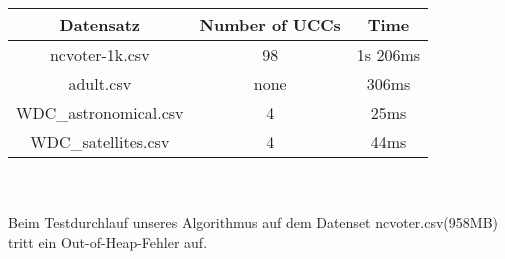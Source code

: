\documentclass{scrartcl}
\begin{document}
\begin{tabular}{c|c|c}
Datensatz & Number of UCCs & Time \\
\hline
ncvoter-1k.csv & 98 & 1s 206ms \\
adult.csv & none & 306ms \\
WDC\_astronomical.csv & 4 & 25ms \\
WDC\_satellites.csv & 4 & 44ms\\

\end{tabular}
\\
\\
Beim Testdurchlauf unseres Algorithmus auf dem Datenset ncvoter.csv(958MB) tritt ein Out-of-Heap-Fehler auf.\\
\end{document}
